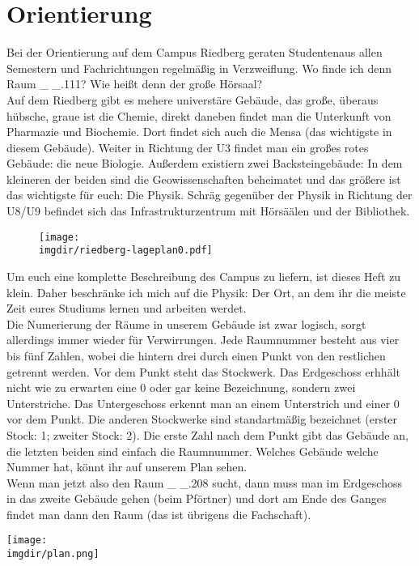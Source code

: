\section{Orientierung}
Bei der Orientierung auf dem Campus Riedberg geraten Studentenaus allen Semestern und Fachrichtungen regelmä\ss ig in Verzweiflung. Wo finde ich denn Raum \_ \_.111? Wie hei\ss t denn der gro\ss e Hörsaal?\\
Auf dem Riedberg gibt es mehere universtäre Gebäude, das gro\ss e, überaus hübsche, graue ist die Chemie, direkt daneben findet man die Unterkunft von Pharmazie und Biochemie. Dort findet sich auch die Mensa (das wichtigste in diesem Gebäude). Weiter in Richtung der U3 findet man ein gro\ss es rotes Gebäude: die neue Biologie. Au\ss erdem existiern zwei Backsteingebäude: In dem kleineren der beiden sind die Geowissenschaften beheimatet und das grö\ss ere ist das wichtigste für euch: Die Physik. Schräg gegenüber der Physik in Richtung der U8/U9 befindet sich das Infrastrukturzentrum mit Hörsäälen und der Bibliothek.
\vfil
\begin{figure}[h]
	\centering
    \texttt{[image: \\imgdir/riedberg-lageplan0.pdf]}
\end{figure}
\newpage
Um euch eine komplette Beschreibung des Campus zu liefern, ist dieses Heft zu klein. Daher beschränke ich mich auf die Physik: Der Ort, an dem ihr die meiste Zeit eures Studiums lernen und arbeiten werdet.\\
Die Numerierung der Räume in unserem Gebäude ist zwar logisch, sorgt allerdings immer wieder für Verwirrungen. Jede Raumnummer besteht aus vier bis fünf Zahlen, wobei die hintern drei durch einen Punkt von den restlichen getrennt werden. Vor dem Punkt steht das Stockwerk. Das Erdgeschoss erhhält nicht wie zu erwarten eine 0 oder gar keine Bezeichnung, sondern zwei Unterstriche. Das Untergeschoss erkennt man an einem Unterstrich und einer 0 vor dem Punkt. Die anderen Stockwerke sind standartmä\ss ig bezeichnet (erster Stock: 1; zweiter Stock: 2). Die erste Zahl nach dem Punkt gibt das Gebäude an, die letzten beiden sind einfach die Raumnummer. Welches Gebäude welche Nummer hat, könnt ihr auf unserem Plan sehen.\\
Wenn man jetzt also den Raum \_ \_.208 sucht, dann muss man im Erdgeschoss in das zweite Gebäude gehen (beim Pförtner) und dort am Ende des Ganges findet man dann den Raum (das ist übrigens die Fachschaft).
\vfil
\begin{center}
    \texttt{[image: \\imgdir/plan.png]}
\end{center}